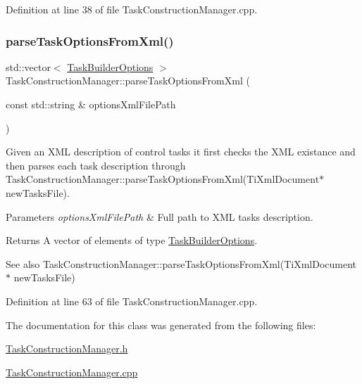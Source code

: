 Definition at line 38 of file Task\+Construction\+Manager.\+cpp.

\hypertarget{classocra_1_1TaskConstructionManager_ac15f4ecd951f446e1f8a8bb33cc6c044}{}\label{classocra_1_1TaskConstructionManager_ac15f4ecd951f446e1f8a8bb33cc6c044} 
\subsubsection{\texorpdfstring{parse\+Task\+Options\+From\+Xml()}{parseTaskOptionsFromXml()}}
{\footnotesize\ttfamily std\+::vector$<$ \hyperlink{classocra_1_1TaskBuilderOptions}{Task\+Builder\+Options} $>$ Task\+Construction\+Manager\+::parse\+Task\+Options\+From\+Xml (\begin{DoxyParamCaption}\item[{const std\+::string \&}]{options\+Xml\+File\+Path }\end{DoxyParamCaption})}

Given an X\+ML description of control tasks it first checks the X\+ML existance and then parses each task description through Task\+Construction\+Manager\+::parse\+Task\+Options\+From\+Xml(\+Ti\+Xml\+Document$\ast$ new\+Tasks\+File).


\begin{DoxyParams}{Parameters}
{\em options\+Xml\+File\+Path} & Full path to X\+ML tasks description.\\
\hline
\end{DoxyParams}
\begin{DoxyReturn}{Returns}
A vector of elements of type \hyperlink{classocra_1_1TaskBuilderOptions}{Task\+Builder\+Options}. 
\end{DoxyReturn}
\begin{DoxySeeAlso}{See also}
Task\+Construction\+Manager\+::parse\+Task\+Options\+From\+Xml(\+Ti\+Xml\+Document$\ast$ new\+Tasks\+File) 
\end{DoxySeeAlso}


Definition at line 63 of file Task\+Construction\+Manager.\+cpp.



The documentation for this class was generated from the following files\+:\begin{DoxyCompactItemize}
\item 
\hyperlink{TaskConstructionManager_8h}{Task\+Construction\+Manager.\+h}\item 
\hyperlink{TaskConstructionManager_8cpp}{Task\+Construction\+Manager.\+cpp}\end{DoxyCompactItemize}
